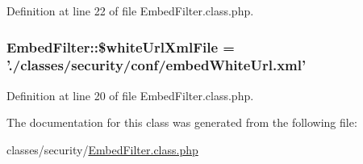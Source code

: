Definition at line 22 of file Embed\+Filter.\+class.\+php.

\hypertarget{classEmbedFilter_aad143e16d225c65d096f44b325744c89}{
\subsubsection[{\$white\+Url\+Xml\+File}]{\setlength{\rightskip}{0pt plus 5cm}Embed\+Filter\+::\$white\+Url\+Xml\+File = './classes/security/conf/embed\+White\+Url.\+xml'}}\label{classEmbedFilter_aad143e16d225c65d096f44b325744c89}


Definition at line 20 of file Embed\+Filter.\+class.\+php.



The documentation for this class was generated from the following file\+:\begin{DoxyCompactItemize}
\item 
classes/security/\hyperlink{EmbedFilter_8class_8php}{Embed\+Filter.\+class.\+php}\end{DoxyCompactItemize}

